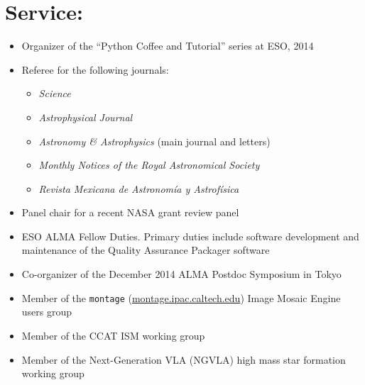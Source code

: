 \documentclass{article}
\begin{document}
\section*{Service:}
\begin{itemize}
    \item Organizer of the ``Python Coffee and Tutorial'' series at ESO, 2014
    \item Referee for the following journals:
        \begin{itemize}
            \item \textit{Science}
            \item \textit{Astrophysical Journal}
            \item \textit{Astronomy \& Astrophysics} (main journal and letters)
            \item \textit{Monthly Notices of the Royal Astronomical Society}
            \item \textit{Revista Mexicana de Astronom{\'i}a y Astrof{\'i}sica}
    \end{itemize}
    \item Panel chair for a recent NASA grant review panel
    \item ESO ALMA Fellow Duties.  Primary duties include
        software development and maintenance of the Quality Assurance Packager
        software
    \item Co-organizer of the December 2014 ALMA Postdoc Symposium in Tokyo
    \item Member of the \texttt{montage} (\url{montage.ipac.caltech.edu}) Image
        Mosaic Engine users group
    \item Member of the CCAT ISM working group
    \item Member of the Next-Generation VLA (NGVLA) high mass star formation
        working group
\end{itemize}





\newpage
\nocite{*}
\begin{footnotesize}

%

\end{footnotesize}
\end{document}

